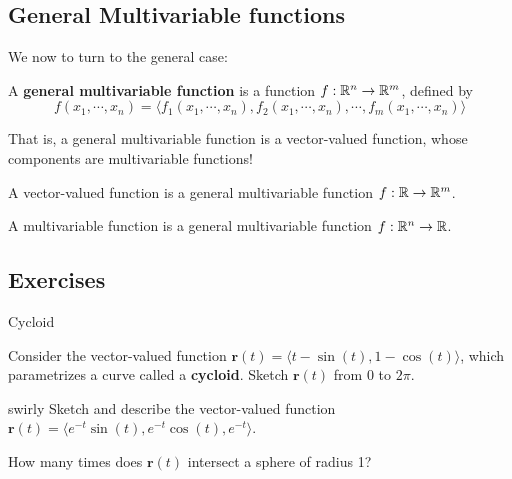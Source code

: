 \subsection{General Multivariable functions}\label{generalmulti}

We now to turn to the general case:

\begin{definition}
A \textbf{general multivariable function} is a function $f : \mathbb{R}^n \to \mathbb{R}^m$, defined by 
$$f(x_1, \cdots, x_n) = \big\langle f_1(x_1, \cdots, x_n), f_2(x_1, \cdots, x_n), \cdots, f_m(x_1, \cdots, x_n) \big\rangle$$

\end{definition}

That is, a general multivariable function is a vector-valued function, whose components are multivariable functions!

\begin{example}
A vector-valued function is a general multivariable function $f : \mathbb{R} \to \mathbb{R}^m$.
\end{example}

\begin{example}
A multivariable function is a general multivariable function $f : \mathbb{R}^n \to \mathbb{R}$.
\end{example}


\subsection{Exercises}

\begin{problem}{Cycloid}

Consider the vector-valued function $\bm{r}(t) = \langle t-\sin(t), 1-\cos(t) \rangle$, which parametrizes a curve called a \textbf{cycloid}.  Sketch $\bm{r}(t)$ from $0$ to $2\pi$.

\end{problem}

\begin{problem}{swirly}
Sketch and describe the vector-valued function $\bm{r}(t) = \langle e^{-t}\sin(t), e^{-t}\cos(t), e^{-t} \rangle$.  

\begin{subproblems}
\item How many times does $\bm{r}(t)$ intersect a sphere of radius 1?
\end{subproblems}

\end{problem}


